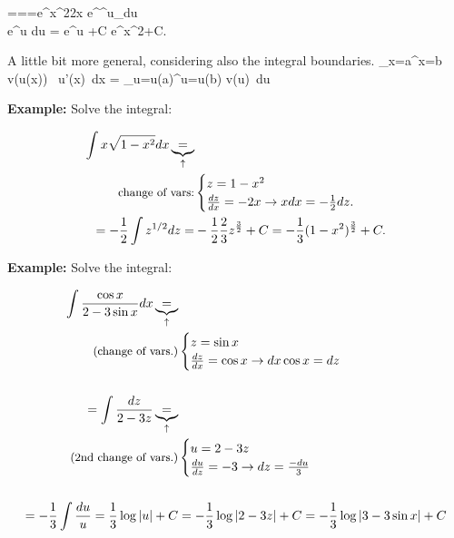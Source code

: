 \bnn
 ===e^{x^2}2x \quad \rightarrow \int e^{^u}_{du}\\ 
 \rightarrow \int e^u du = e^u +C \rightarrow e^{x^2}+C.
\enn 

A little bit more general, considering also the integral boundaries.
\bnn
\int_{x=a}^{x=b} v(u(x)) \, u'(x)\, dx = \int_{u=u(a)}^{u=u(b)} v(u)\, du 
\enn 

{\bf Example:} Solve the integral:

\begin{eqnarray*}
\int x\sqrt{1-x^2}dx  \underbrace{=}_{\uparrow}& \\
 \mbox{{\small change of vars:}} & \begin{cases} z=1-x^2 \\
 \frac{dz}{dx}=-2x \rightarrow xdx = -\frac{1}{2}dz. \end{cases}\\
 = -\frac{1}{2}\int z^{1/2}dz = &-\frac{1}{2}\frac{2}{3}z^{\frac{3}{2}}+C=-\frac{1}{3}(1-x^2)^{\frac{3}{2}}+C. 
\end{eqnarray*}

{\bf Example:} Solve the integral:

\begin{eqnarray*}
\int \frac{\cos x}{2-3\sin x}dx\underbrace{=}_{\uparrow}&  \\ 
\mbox{{\small (change of vars.)}} &\begin{cases} z= \sin x \\ \frac{dz}{dx}=\cos x \rightarrow dx \cos x = dz\end{cases} \\
\\
=\int \frac{dz}{2-3z} \underbrace{=}_{\uparrow}&  \\
\mbox{{\small (2nd change of vars.)}} & \begin{cases} u = 2-3z \\ \frac{du}{dz}=-3 \rightarrow dz = \frac{-du}{3} \end{cases} \\
\\
=-\frac{1}{3} \int \frac{du}{u} = \frac{1}{3}\log |u|+C &=  -\frac{1}{3}\log |2-3z|+C  =-\frac{1}{3}\log |3-3\sin x|+C 
\end{eqnarray*}

